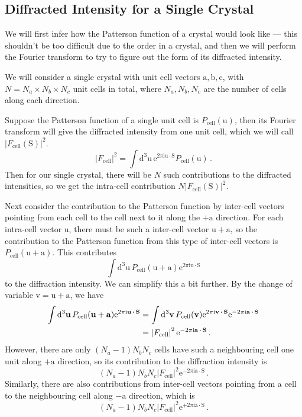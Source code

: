 \documentclass{article}
\theoremstyle{plain}\theoremheaderfont{\normalfont\itshape}\theorembodyfont{\rmfamily}\theoremseparator{.}\newtheorem*{rem}{Remark}\newtheorem*{ex}{Example}\newtheorem*{proof}{Proof}\newtheorem*{altp}{Alternative proof}
\theoremstyle{plain}\theoremheaderfont{\normalfont\bfseries}\theorembodyfont{\rmfamily}\theoremseparator{.}\newtheorem{thm}{Theorem}[section]\newtheorem{lem}[thm]{Lemma}\newtheorem{prop}[thm]{Proposition}\newtheorem*{cor}{Corollary}\newtheorem{defn}[thm]{Definition}\newtheorem{clm}[thm]{Claim}\newtheorem{clminproof}{Claim}\newtheorem*{law}{Law}\newtheorem{pos}[thm]{Postulate}
\theoremstyle{break}\theoremheaderfont{\normalfont\itshape}\theorembodyfont{\rmfamily}\theoremseparator{.\medskip}\newtheorem*{proofskip}{Proof}\newtheorem*{exs}{Examples}\newtheorem*{rems}{Remarks}
\theoremstyle{break}\theoremheaderfont{\normalfont\bfseries}\theorembodyfont{\rmfamily}\theoremseparator{.\medskip}\newtheorem{lemskip}[thm]{Lemma}\newtheorem{defnskip}[thm]{Definition}\newtheorem{propskip}[thm]{Proposition}\newtheorem{thmskip}[thm]{Theorem}
\numberwithin{equation}{section}
\newcommand{\ii}{\mathrm{i}}
\newcommand{\ee}{\mathrm{e}}
\newcommand{\dd}[2][]{\mathrm{d}^{#1} #2\,}
\newcommand{\vb}[1]{\bm{\mathrm{#1}}}
\newcommand{\vdot}{\,\bm{\mathrm{\cdot}}\,}
\newcommand{\abs}[1]{\left| #1 \right|}
\begin{document}
    \subsection{Diffracted Intensity for a Single Crystal}
    We will first infer how the Patterson function of a crystal would look like --- this shouldn't be too difficult due to the order in a crystal, and then we will perform the Fourier transform to try to figure out the form of its diffracted intensity.

    We will consider a single crystal with unit cell vectors \(\vb{a},\vb{b},\vb{c}\), with \(N=N_a\times N_b\times N_c\) unit cells in total, where \(N_a,N_b,N_c\) are the number of cells along each direction.

    Suppose the Patterson function of a single unit cell is \(P_{\text{cell}}(\vb{u})\), then its Fourier transform will give the diffracted intensity from one unit cell, which we will call \(\abs{F_{\text{cell}}(\vb{S})}^2\).
    \begin{equation}
        \abs{F_{\text{cell}}}^2=\int\dd[3]{\vb{u}}\ee^{2\pi \ii\vb{u}\vdot\vb{S}}P_{\text{cell}}(\vb{u})\,.
    \end{equation}
    Then for our single crystal, there will be \(N\) such contributions to the diffracted intensities, so we get the intra-cell contribution \(N \abs{F_{\text{cell}}(\vb{S})}^2\).

    Next consider the contribution to the Patterson function by inter-cell vectors pointing from each cell to the cell next to it along the \(+\vb{a}\) direction. For each intra-cell vector \(\vb{u}\), there must be such a inter-cell vector \(\vb{u}+\vb{a}\), so the contribution to the Patterson function from this type of inter-cell vectors is \(P_{\text{cell}}(\vb{u}+\vb{a})\). This contributes
    \begin{equation}
        \int\dd[3]{\vb{u}}P_{\text{cell}}(\vb{u}+\vb{a})\ee^{2\pi \ii\vb{u}\vdot\vb{S}}
    \end{equation}
    to the diffraction intensity. We can simplify this a bit further. By the change of variable \(\vb{v}=\vb{u}+\vb{a}\), we have
    \begin{align}
        \int\dd[3]{\vb{u}}P_{\text{cell}}(\vb{u}+\vb{a})\ee^{2\pi \ii\vb{u}\vdot\vb{S}}&=\int\dd[3]{\vb{v}}P_{\text{cell}}(\vb{v})\ee^{2\pi \ii\vb{v}\vdot\vb{S}}\ee^{-2\pi \ii\vb{a}\vdot\vb{S}}\notag \\
        &=\abs{F_{\text{cell}}}^2 \ee^{-2\pi \ii\vb{a}\vdot\vb{S}}\,.
    \end{align}
    However, there are only \((N_a-1)N_bN_c\) cells have such a neighbouring cell one unit along \(+\vb{a}\) direction, so its contribution to the diffraction intensity is
    \begin{equation}
        (N_a-1)N_bN_c\abs{F_{\text{cell}}}^2 \ee^{-2\pi \ii\vb{a}\vdot\vb{S}}\,.
    \end{equation}
    Similarly, there are also contributions from inter-cell vectors pointing from a cell to the neighbouring cell along \(-\vb{a}\) direction, which is
    \begin{equation}
        (N_a-1)N_bN_c\abs{F_{\text{cell}}}^2 \ee^{+2\pi \ii\vb{a}\vdot\vb{S}}\,.
    \end{equation}
\end{document}
